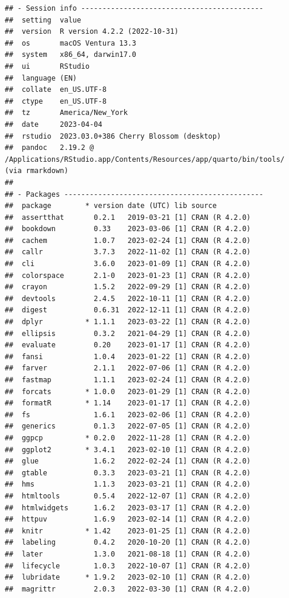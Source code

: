 \documentclass[print]{nuthesis}
\begin{document}
\begin{verbatim}
## - Session info -------------------------------------------
##  setting  value
##  version  R version 4.2.2 (2022-10-31)
##  os       macOS Ventura 13.3
##  system   x86_64, darwin17.0
##  ui       RStudio
##  language (EN)
##  collate  en_US.UTF-8
##  ctype    en_US.UTF-8
##  tz       America/New_York
##  date     2023-04-04
##  rstudio  2023.03.0+386 Cherry Blossom (desktop)
##  pandoc   2.19.2 @ /Applications/RStudio.app/Contents/Resources/app/quarto/bin/tools/ (via rmarkdown)
## 
## - Packages -----------------------------------------------
##  package        * version date (UTC) lib source
##  assertthat       0.2.1   2019-03-21 [1] CRAN (R 4.2.0)
##  bookdown         0.33    2023-03-06 [1] CRAN (R 4.2.0)
##  cachem           1.0.7   2023-02-24 [1] CRAN (R 4.2.0)
##  callr            3.7.3   2022-11-02 [1] CRAN (R 4.2.0)
##  cli              3.6.0   2023-01-09 [1] CRAN (R 4.2.0)
##  colorspace       2.1-0   2023-01-23 [1] CRAN (R 4.2.0)
##  crayon           1.5.2   2022-09-29 [1] CRAN (R 4.2.0)
##  devtools         2.4.5   2022-10-11 [1] CRAN (R 4.2.0)
##  digest           0.6.31  2022-12-11 [1] CRAN (R 4.2.0)
##  dplyr          * 1.1.1   2023-03-22 [1] CRAN (R 4.2.0)
##  ellipsis         0.3.2   2021-04-29 [1] CRAN (R 4.2.0)
##  evaluate         0.20    2023-01-17 [1] CRAN (R 4.2.0)
##  fansi            1.0.4   2023-01-22 [1] CRAN (R 4.2.0)
##  farver           2.1.1   2022-07-06 [1] CRAN (R 4.2.0)
##  fastmap          1.1.1   2023-02-24 [1] CRAN (R 4.2.0)
##  forcats        * 1.0.0   2023-01-29 [1] CRAN (R 4.2.0)
##  formatR        * 1.14    2023-01-17 [1] CRAN (R 4.2.0)
##  fs               1.6.1   2023-02-06 [1] CRAN (R 4.2.0)
##  generics         0.1.3   2022-07-05 [1] CRAN (R 4.2.0)
##  ggpcp          * 0.2.0   2022-11-28 [1] CRAN (R 4.2.0)
##  ggplot2        * 3.4.1   2023-02-10 [1] CRAN (R 4.2.0)
##  glue             1.6.2   2022-02-24 [1] CRAN (R 4.2.0)
##  gtable           0.3.3   2023-03-21 [1] CRAN (R 4.2.0)
##  hms              1.1.3   2023-03-21 [1] CRAN (R 4.2.0)
##  htmltools        0.5.4   2022-12-07 [1] CRAN (R 4.2.0)
##  htmlwidgets      1.6.2   2023-03-17 [1] CRAN (R 4.2.0)
##  httpuv           1.6.9   2023-02-14 [1] CRAN (R 4.2.0)
##  knitr          * 1.42    2023-01-25 [1] CRAN (R 4.2.0)
##  labeling         0.4.2   2020-10-20 [1] CRAN (R 4.2.0)
##  later            1.3.0   2021-08-18 [1] CRAN (R 4.2.0)
##  lifecycle        1.0.3   2022-10-07 [1] CRAN (R 4.2.0)
##  lubridate      * 1.9.2   2023-02-10 [1] CRAN (R 4.2.0)
##  magrittr         2.0.3   2022-03-30 [1] CRAN (R 4.2.0)

\end{verbatim}
\end{document}
